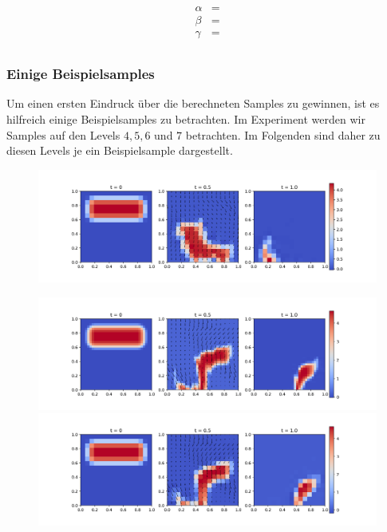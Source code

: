 \begin{align*}
\alpha &= \\
\beta &= \\
\gamma &= \\
\end{align*}
\subsubsection{Einige Beispielsamples}
Um einen ersten Eindruck über die berechneten Samples zu gewinnen, ist es hilfreich einige Beispielsamples zu betrachten. Im Experiment werden wir Samples auf den Levels $ 4,5,6 $ und $ 7 $ betrachten. Im Folgenden sind daher zu diesen Levels je ein Beispielsample dargestellt.
\begin{figure}[H]
	\centering
	\includegraphics[width=\textwidth]{plots/sample_4_1.png} 
\end{figure}
\begin{figure}[H]
	\centering
	\includegraphics[width=\textwidth]{plots/sample_5_1.png} 
	\includegraphics[width=\textwidth]{plots/sample_coarse_5_1.png} 
\end{figure}
